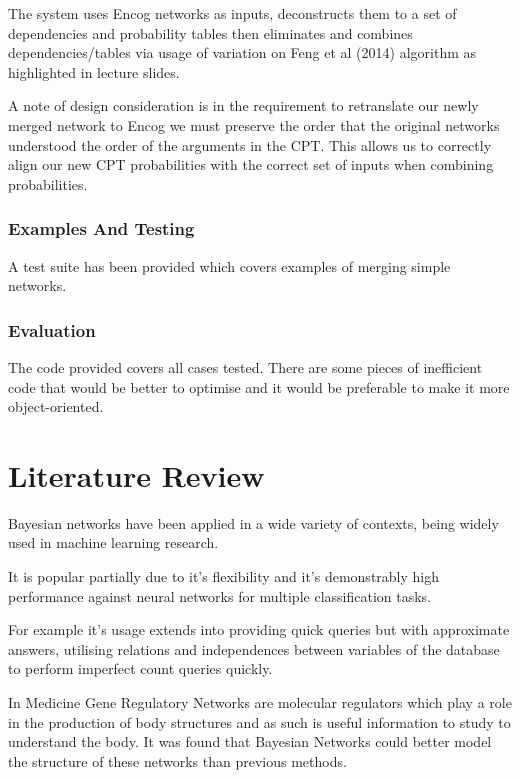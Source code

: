 \documentclass[10pt,a4paper]{article}
\begin{document}
The system uses Encog networks as inputs, deconstructs them to a set of dependencies and probability tables then eliminates and combines dependencies/tables via usage of variation on Feng et al (2014) algorithm as highlighted in lecture slides\cite{feng}.

A note of design consideration is in the requirement to retranslate our newly merged network to Encog we must preserve the order that the original networks understood the order of the arguments in the CPT. This allows us to correctly align our new CPT  probabilities with the correct set of inputs when combining probabilities.

\subsubsection{Examples And Testing}

A test suite has been provided which covers examples of merging simple networks.


\subsubsection{Evaluation}

The code provided covers all cases tested. There are some pieces of inefficient code that would be better to optimise and  it would be preferable to make it more object-oriented.

\section{Literature Review}

Bayesian networks have been applied in a wide variety of contexts, being widely used in machine learning research.

It is popular partially due to it's flexibility and it's demonstrably high performance against neural networks for multiple classification tasks\cite{book}.

For example it's usage extends into providing quick queries but with approximate answers, utilising relations and independences between variables of the database to perform imperfect count queries quickly\cite{book}.

In Medicine Gene Regulatory Networks are molecular regulators which play a role in the production of body structures and as such is useful information to study to understand the body. It was found that Bayesian Networks could better model the structure of these networks than previous methods\cite{gene}.
\end{document}

